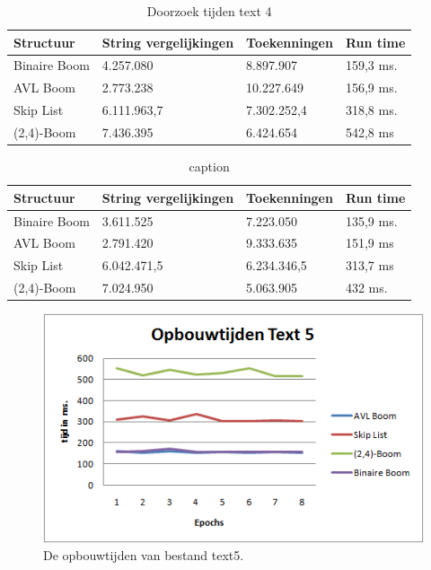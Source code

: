 \begin{table}
\begin{tabularx}{\linewidth}{| l | X| X| X | }
 \hline
 Structuur & String vergelijkingen &  Toekenningen & Run time \\
 \hline
 	Binaire Boom &4.257.080

 & 8.897.907 & 159,3
 ms. \\
 	\hline
 	AVL Boom &2.773.238

 & 10.227.649 & 156,9 ms. \\
 	\hline
 	Skip List & 6.111.963,7
& 7.302.252,4
 & 318,8
 ms. \\
 	\hline
 	(2,4)-Boom & 7.436.395
& 6.424.654
 & 542,8
 ms \\
 	\hline
\end{tabularx}
\label{tbl_text4_search}
\caption{Doorzoek tijden text 4}
\end{table}


\begin{table}
\begin{tabularx}{\linewidth}{| l | X| X| X | }
 \hline
 Structuur & String vergelijkingen &  Toekenningen & Run time \\
 \hline
 	Binaire Boom & 3.611.525
&  7.223.050
& 135,9
 ms. \\
 	\hline
 	AVL Boom & 2.791.420
& 9.333.635

 & 151,9
 ms \\
 	\hline
 	Skip List &6.042.471,5
 & 6.234.346,5
& 313,7
 ms \\
 	\hline
 	(2,4)-Boom & 7.024.950
&  5.063.905
&  432
ms. \\
 	\hline
\end{tabularx}
\label{tbl_text1_search}
\caption{caption}
\end{table}


\begin{figure}[h]
	\centering
		\includegraphics[width=\textwidth]{chap7/opbouwtijdtext5}
		\caption{De opbouwtijden van bestand text5.}
	\label{fig:opbouwtext5}
\end{figure}

